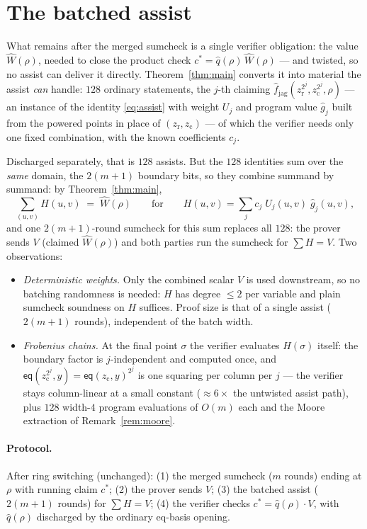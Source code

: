 \documentclass[11pt]{article}
\newcommand{\eq}{\mathsf{eq}}
\newcommand{\fjag}{\hat f_{\mathrm{jag}}}
\begin{document}
\section{The batched assist}\label{sec:protocol}

What remains after the merged sumcheck is a single verifier
obligation: the value $\widehat W(\rho)$, needed to close the product
check $c^* = \hat q(\rho)\,\widehat W(\rho)$ --- and twisted, so no
assist can deliver it directly. Theorem~\ref{thm:main} converts it
into material the assist \emph{can} handle: $128$ ordinary
statements, the $j$-th claiming
$\fjag(z_{\mathrm r}^{2^j}, z_{\mathrm c}^{2^j}, \rho)$ --- an
instance of the identity \eqref{eq:assist} with weight $U_j$ and
program value $\hat g_j$ built from the powered points in place of
$(z_{\mathrm r}, z_{\mathrm c})$ --- of which the verifier needs only
one fixed combination, with the known coefficients $c_j$.

Discharged separately, that is $128$ assists. But the $128$
identities sum over the \emph{same} domain, the $2(m{+}1)$ boundary
bits, so they combine summand by summand: by Theorem~\ref{thm:main},
\[
  \sum_{(u,v)} H(u,v) \;=\; \widehat W(\rho)
  \qquad\text{for}\qquad
  H(u,v) = \sum_{j} c_{j}\; U_{j}(u,v)\; \hat g_{j}(u,v),
\]
and one $2(m{+}1)$-round sumcheck for this sum replaces all $128$:
the prover sends $V$ (claimed $\widehat W(\rho)$) and both parties
run the sumcheck for $\sum H = V$. Two observations:

\begin{itemize}[nosep]
\item \emph{Deterministic weights.} Only the combined scalar $V$ is
  used downstream, so no batching randomness is needed: $H$ has degree
  $\le 2$ per variable and plain sumcheck soundness on $H$ suffices.
  Proof size is that of a single assist ($2(m{+}1)$ rounds),
  independent of the batch width.
\item \emph{Frobenius chains.} At the final point $\sigma$ the verifier
  evaluates $H(\sigma)$ itself: the boundary factor is
  $j$-independent and computed once, and
  $\eq(z_{\mathrm c}^{2^j}, y) = \eq(z_{\mathrm c}, y)^{2^j}$ is one
  squaring per column per $j$ --- the verifier stays column-linear at
  a small constant ($\approx 6\times$ the untwisted assist path), plus
  $128$ width-$4$ program evaluations of $O(m)$ each and the Moore
  extraction of Remark~\ref{rem:moore}.
\end{itemize}

\paragraph{Protocol.} After ring switching (unchanged): (1) the merged
sumcheck ($m$ rounds) ending at $\rho$ with running claim $c^*$;
(2) the prover sends $V$; (3) the batched assist ($2(m{+}1)$ rounds)
for $\sum H = V$; (4) the verifier checks
$c^* = \hat q(\rho)\cdot V$, with $\hat q(\rho)$ discharged by the
ordinary eq-basis opening.
\end{document}
